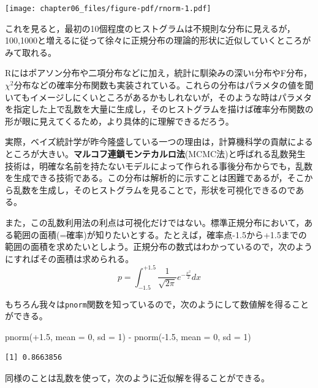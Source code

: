 \documentclass[
  a4paper,
]{ltjsbook}
\newenvironment{Shaded}{\begin{snugshade}}{\end{snugshade}}
\newcommand{\AttributeTok}[1]{\textcolor[rgb]{0.40,0.45,0.13}{#1}}
\newcommand{\DecValTok}[1]{\textcolor[rgb]{0.68,0.00,0.00}{#1}}
\newcommand{\FloatTok}[1]{\textcolor[rgb]{0.68,0.00,0.00}{#1}}
\newcommand{\FunctionTok}[1]{\textcolor[rgb]{0.28,0.35,0.67}{#1}}
\newcommand{\NormalTok}[1]{\textcolor[rgb]{0.00,0.23,0.31}{#1}}
\newcommand{\SpecialCharTok}[1]{\textcolor[rgb]{0.37,0.37,0.37}{#1}}
\begin{document}
\texttt{[image: chapter06\_files/figure-pdf/rnorm-1.pdf]}

これを見ると，最初の10個程度のヒストグラムは不規則な分布に見えるが，100,1000と増えるに従って徐々に正規分布の理論的形状に近似していくところがみて取れる。

Rにはポアソン分布や二項分布などに加え，統計に馴染みの深いt分布やF分布，\(\chi^2\)分布などの確率分布関数も実装されている。これらの分布はパラメタの値を聞いてもイメージしにくいところがあるかもしれないが，そのような時はパラメタを指定した上で乱数を大量に生成し，そのヒストグラムを描けば確率分布関数の形が眼に見えてくるため，より具体的に理解できるだろう。

実際，ベイズ統計学が昨今隆盛している一つの理由は，計算機科学の貢献によるところが大きい。\textbf{マルコフ連鎖モンテカルロ法}(MCMC法)と呼ばれる乱数発生技術は，明確な名前を持たないモデルによって作られる事後分布からでも，乱数を生成できる技術である。この分布は解析的に示すことは困難であるが，そこから乱数を生成し，そのヒストグラムを見ることで，形状を可視化できるのである。

また，この乱数利用法の利点は可視化だけではない。標準正規分布において，ある範囲の面積(=確率)が知りたいとする。たとえば，確率点-1.5から+1.5までの範囲の面積を求めたいとしよう。正規分布の数式はわかっているので，次のようにすればその面積は求められる。
\[ p = \int_{-1.5}^{+1.5} \frac{1}{\sqrt{2\pi}}e^{-\frac{x^2}{2}} dx \]

もちろん我々は\texttt{pnorm}関数を知っているので，次のようにして数値解を得ることができる。

\begin{Shaded}
\begin{Highlighting}[]
\FunctionTok{pnorm}\NormalTok{(}\SpecialCharTok{+}\FloatTok{1.5}\NormalTok{, }\AttributeTok{mean =} \DecValTok{0}\NormalTok{, }\AttributeTok{sd =} \DecValTok{1}\NormalTok{) }\SpecialCharTok{{-}} \FunctionTok{pnorm}\NormalTok{(}\SpecialCharTok{{-}}\FloatTok{1.5}\NormalTok{, }\AttributeTok{mean =} \DecValTok{0}\NormalTok{, }\AttributeTok{sd =} \DecValTok{1}\NormalTok{)}
\end{Highlighting}
\end{Shaded}

\begin{verbatim}
[1] 0.8663856
\end{verbatim}

同様のことは乱数を使って，次のように近似解を得ることができる。
\end{document}
